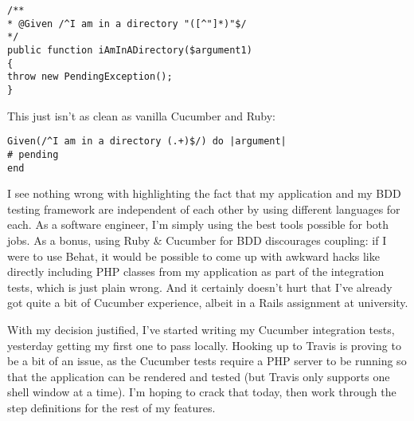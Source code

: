 \begin{minipage}{\textwidth}
\begin{lstlisting}
/**
* @Given /^I am in a directory "([^"]*)"$/
*/
public function iAmInADirectory($argument1)
{
throw new PendingException();
}
\end{lstlisting}
\end{minipage}

This just isn't as clean as vanilla Cucumber and Ruby:

\begin{minipage}{\textwidth}
\begin{lstlisting}
Given(/^I am in a directory (.+)$/) do |argument|
# pending
end
\end{lstlisting}
\end{minipage}

I see nothing wrong with highlighting the fact that my application and my BDD testing framework are independent of each other by using different languages for each. As a software engineer, I'm simply using the best tools possible for both jobs. As a bonus, using Ruby \& Cucumber for BDD discourages coupling: if I were to use Behat, it would be possible to come up with awkward hacks like directly including PHP classes from my application as part of the integration tests, which is just plain wrong. And it certainly doesn't hurt that I've already got quite a bit of Cucumber experience, albeit in a Rails assignment at university.

With my decision justified, I've started writing my Cucumber integration tests, yesterday getting my first one to pass locally. Hooking up to Travis is proving to be a bit of an issue, as the Cucumber tests require a PHP server to be running so that the application can be rendered and tested (but Travis only supports one shell window at a time). I'm hoping to crack that today, then work through the step definitions for the rest of my features.